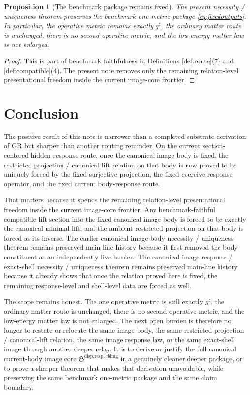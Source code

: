 \documentclass[11pt]{article}
\newcommand{\CompletedMetric}{g^{\sharp}}
\newcommand{\CurrentBodyImageCore}{\mathfrak S^{\mathrm{disp,resp,cbimg}}}
\newtheorem{proposition}{Proposition}
\begin{document}
\begin{proposition}[The benchmark package remains fixed]
\label{prop:benchmark}
The present necessity / uniqueness theorem preserves the benchmark one-metric package \eqref{eq:fixedoutputs}. In particular, the operative metric remains exactly \(\CompletedMetric\), the ordinary matter route is unchanged, there is no second operative metric, and the low-energy matter law is not enlarged.
\end{proposition}

\begin{proof}
This is part of benchmark faithfulness in Definitions \ref{def:route}(7) and \ref{def:compatible}(4). The present note removes only the remaining relation-level presentational freedom inside the current image-core frontier.
\end{proof}

\section{Conclusion}

The positive result of this note is narrower than a completed substrate derivation of GR but sharper than another routing reminder. On the current section-centered hidden-response route, once the canonical image body is fixed, the restricted projection / canonical-lift relation on that body is now proved to be uniquely forced by the fixed surjective projection, the fixed coercive response operator, and the fixed current body-response route.

That matters because it spends the remaining relation-level presentational freedom inside the current image-core frontier. Any benchmark-faithful compatible lift section into the fixed canonical image body is forced to be exactly the canonical minimal lift, and the ambient restricted projection on that body is forced as its inverse. The earlier canonical-image-body necessity / uniqueness theorem remains preserved main-line history because it first removed the body constituent as an independently live burden. The canonical-image-response / exact-shell necessity / uniqueness theorem remains preserved main-line history because it already shows that once the relation proved here is fixed, the remaining response-level and shell-level data are forced as well.

The scope remains honest. The one operative metric is still exactly \(\CompletedMetric\), the ordinary matter route is unchanged, there is no second operative metric, and the low-energy matter law is not enlarged. The next open burden is therefore no longer to restate or relocate the same image body, the same restricted projection / canonical-lift relation, the same image response law, or the same exact-shell image through another deeper relay. It is to derive or justify the full canonical current-body image core \(\CurrentBodyImageCore\) in a genuinely cleaner deeper package, or to prove a sharper theorem that makes that derivation unavoidable, while preserving the same benchmark one-metric package and the same claim boundary.
\end{document}
